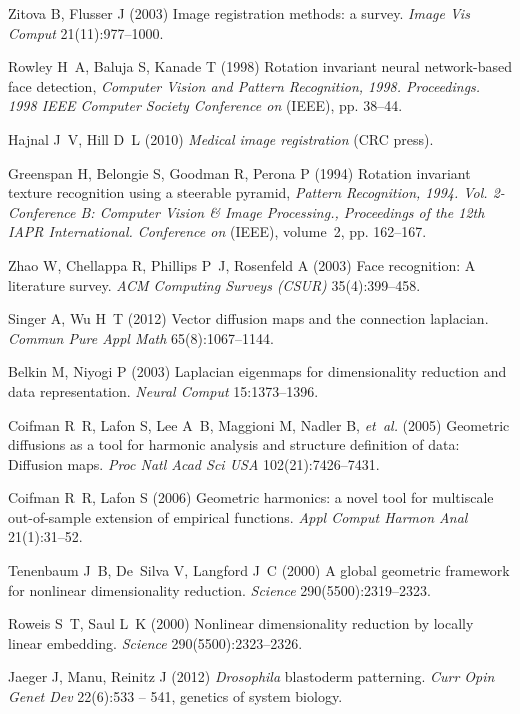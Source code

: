 \documentclass{pnastwo}
\begin{document}
\begin{article}
\begin{thebibliography}{10}
Zitova B, Flusser J (2003) Image registration methods: a survey. \textit{Image Vis Comput} 21(11):977--1000.

Rowley H~A, Baluja S, Kanade T (1998) Rotation invariant neural network-based
  face detection, \textit{Computer Vision and Pattern Recognition, 1998.
  Proceedings. 1998 IEEE Computer Society Conference on} (IEEE), pp. 38--44.

Hajnal J~V, Hill D~L (2010) \textit{Medical image registration} (CRC press).

Greenspan H, Belongie S, Goodman R, Perona P (1994) Rotation invariant texture
  recognition using a steerable pyramid, \textit{Pattern Recognition, 1994.
  Vol. 2-Conference B: Computer Vision \& Image Processing., Proceedings of the
  12th IAPR International. Conference on} (IEEE), volume~2, pp. 162--167.

Zhao W, Chellappa R, Phillips P~J, Rosenfeld A (2003) Face recognition: A
  literature survey. \textit{ACM Computing Surveys (CSUR)} 35(4):399--458.

Singer A, Wu H~T (2012) Vector diffusion maps and the connection laplacian.
  \textit{Commun Pure Appl Math} 65(8):1067--1144.

Belkin M, Niyogi P (2003) Laplacian eigenmaps for dimensionality reduction and
  data representation. \textit{Neural Comput} 15:1373--1396.

Coifman R~R, Lafon S, Lee A~B, Maggioni M, Nadler B, \textit{et~al.} (2005)
  Geometric diffusions as a tool for harmonic analysis and structure definition
  of data: Diffusion maps. \textit{Proc Natl Acad Sci USA} 102(21):7426--7431.

Coifman R~R, Lafon S (2006) Geometric harmonics: a novel tool for multiscale
  out-of-sample extension of empirical functions. \textit{Appl Comput Harmon Anal} 21(1):31--52.

Tenenbaum J~B, De~Silva V, Langford J~C (2000) A global geometric framework for
  nonlinear dimensionality reduction. \textit{Science} 290(5500):2319--2323.

Roweis S~T, Saul L~K (2000) Nonlinear dimensionality reduction by locally
  linear embedding. \textit{Science} 290(5500):2323--2326.

Jaeger J, Manu, Reinitz J (2012) \textit{{D}rosophila} blastoderm patterning.
  \textit{Curr Opin Genet Dev} 22(6):533 -- 541, genetics of system biology.


\end{thebibliography}
\end{article}
\end{document}
